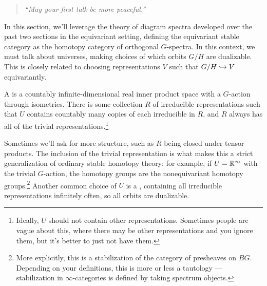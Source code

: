 \begin{quote}\textit{
	``May your first talk be more peaceful.''
}\end{quote}
In this section, we'll leverage the theory of diagram spectra developed over the past two sections in the
equivariant setting, defining the equivariant stable category as the homotopy category of orthogonal $G$-spectra.
In this context, we must talk about universes, making choices of which orbits $G/H$ are dualizable. This is closely
related to choosing representations $V$ such that $G/H\hookrightarrow V$ equivariantly.
\begin{defn}
A  is a countably infinite-dimensional real inner product space with a $G$-action through
isometries. There is some collection $R$ of irreducible representations such that $U$ contains countably many
copies of each irreducible in $R$, and $R$ always has all of the trivial representations.\footnote{Ideally, $U$
should not contain other representations. Sometimes people are vague about this, where there may be other
representations and you ignore them, but it's better to just not have them.}
\end{defn}
Sometimes we'll ask for more structure, such as $R$ being closed under tensor products. The inclusion of the
trivial representation is what makes this a strict generalization of ordinary stable
homotopy theory: for example, if $U = \mathbb R^\infty$ with the trivial $G$-action, the homotopy groups are the
nonequivariant homotopy groups.\footnote{More explicitly, this is a stabilization of the category of presheaves on
$BG$. Depending on your definitions, this is more or less a tautology --- stabilization in $\infty$-categories is
defined by taking spectrum objects.} Another common choice of $U$ is a , containing all
irreducible representations infinitely often, so all orbits are dualizable.

